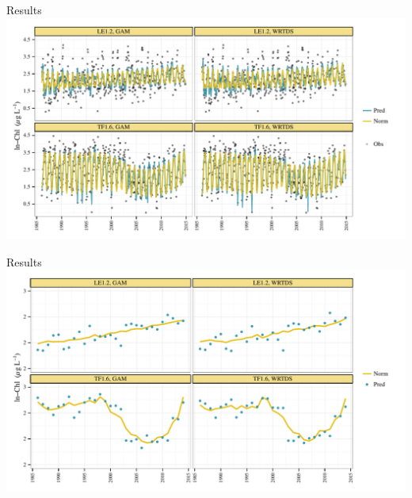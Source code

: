 \documentclass[serif]{beamer}\usepackage[]{graphicx}\usepackage[]{color}
\begin{document}
\begin{frame}{Results}
\includegraphics[width=\textwidth]{figs/predmo.pdf}
\end{frame}

\begin{frame}{Results}
\includegraphics[width=\textwidth]{figs/predann.pdf}
\end{frame}
\end{document}
